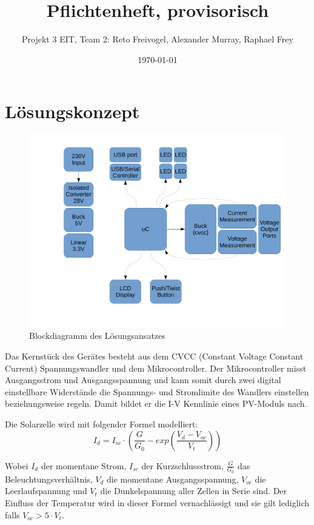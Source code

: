 \documentclass{article}
\title{Pflichtenheft, provisorisch}
\date{\today}
\author{Projekt 3 EIT, Team 2: Reto Freivogel, Alexander Murray, Raphael Frey}
\begin{document}
\maketitle

\section{L\"osungskonzept}
\begin{figure}[h!]
    \begin{centering}
    \includegraphics[width=.667\textwidth]{grob-blockdiagramm.pdf}
    \caption{Blockdiagramm des L\"osungsansatzes}
    \end{centering}
\end{figure}

Das Kernst\"uck des Ger\"ates besteht  aus dem CVCC (Constant Voltage Constant
Current) Spannungswandler  und dem Mikrocontroller. Der  Mikrocontroller misst
Ausgangsstrom  und   Ausgangsspannung  und  kann  somit   durch  zwei  digital
einstellbare  Widerst\"ande  die  Spannungs-   und  Stromlimite  des  Wandlers
einstellen  beziehungsweise regeln. Damit  bildet er  die I-V  Kennlinie eines
PV-Moduls nach.

Die Solarzelle wird mit folgender Formel modelliert:
\begin{equation}
I_d = I_{sc} \cdot \left(\frac{G}{G_0} - exp\left(\frac{V_d-V_{oc}}{V_t}\right)\right)
\end{equation}

Wobei   $I_{d}$   der   momentane  Strom,   $I_{sc}$   der   Kurzschlussstrom,
$\frac{G}{G_0}$    das   Beleuchtungsverh\"altnis,    $V_d$   die    momentane
Ausgangsspannung, $V_{oc}$  die Leerlaufspannung und $V_t$  die Dunkelspannung
aller Zellen in Serie sind. Der Einfluss der Temperatur wird in dieser Formel
vernachl\"assigt und sie gilt lediglich falls $V_{oc} > 5 \cdot V_t$.
\end{document}
